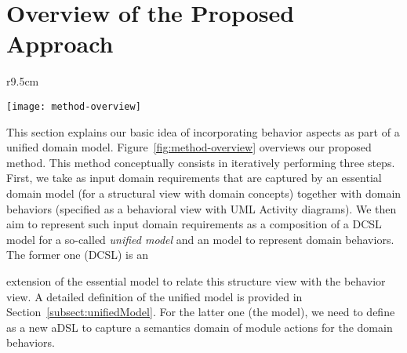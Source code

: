 \section{Overview of the Proposed Approach}
\label{sect:overviewApproach}
{\makeatletter
	\let\par\@@par
	\par{}
	\everypar{}
	\begin{wrapfigure}{r}{9.5cm}
		\begin{center}
			\vspace{-1cm}		\texttt{[image: method-overview]}
		\end{center}
		\vspace{-0.5cm}	
		\caption{An overview of our method.} %
		\label{fig:method-overview}
	\end{wrapfigure}
This section explains our basic idea of incorporating behavior aspects as part of a unified domain model.
%
%
%
Figure~\ref{fig:method-overview} overviews our proposed method. This method conceptually consists in iteratively performing three steps. First, we take as input domain requirements that are captured by an essential domain model (for a structural view with domain concepts) together with domain behaviors (specified as a behavioral view with UML Activity diagrams). We then aim to represent such input domain requirements as a composition of a DCSL model for a so-called \textit{unified model} and an \agl model to represent domain behaviors. The former one (DCSL) is an%
\par}%
\noindent 
extension of the essential model to relate this structure view with the behavior view. A detailed definition of the unified model is provided in Section~\ref{subsect:unifiedModel}. For the latter one (the \agl model), we need to define \agl as a new aDSL to capture a semantics domain of module actions for the domain behaviors. %
